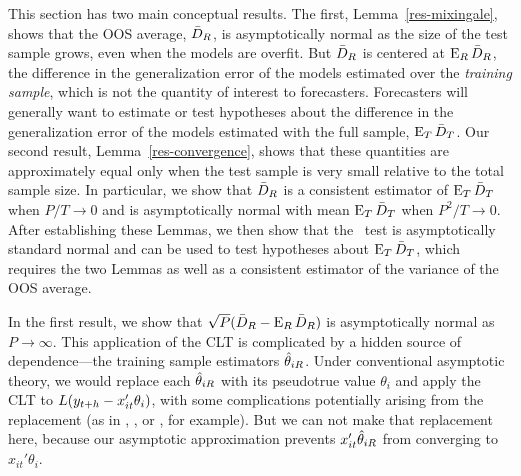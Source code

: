 \documentclass[12pt,draft]{article}
\begin{document}
This section has two main conceptual results. The first,
Lemma~\ref{res-mixingale}, shows that the OOS average, $\bar{D}_{R}$, is
asymptotically normal as the size of the test sample grows, even when
the models are overfit. But $\bar{D}_{R}$ is centered at $\operatorname{E}_R \bar{D}_{R}$, the
difference in the generalization error of the models estimated over
the \emph{training sample}, which is not the quantity of interest to
forecasters. Forecasters will generally want to estimate or test
hypotheses about the difference in the generalization error of the
models estimated with the full sample, $\operatorname{E}_T \bar{D}_{T}$. Our second
result, Lemma~\ref{res-convergence}, shows that these quantities are
approximately equal only when the test sample is very small relative
to the total sample size. In particular, we show that $\bar{D}_{R}$ is a
consistent estimator of $\operatorname{E}_T \bar{D}_{T}$ when $P/T \to 0$ and is
asymptotically normal with mean $\operatorname{E}_T \bar{D}_{T}$ when $P^2/T \to 0$. After
establishing these Lemmas, we then show that the \oost\ test is
asymptotically standard normal and can be used to test hypotheses
about $\operatorname{E}_T \bar{D}_{T}$, which requires the two Lemmas as well as a
consistent estimator of the variance of the OOS average.

In the first result, we show that
$\sqrt{P} (\bar{D}_{R} - \operatorname{E}_R \bar{D}_{R})$ is asymptotically normal as $P \to
\infty$. This application of the CLT is complicated by a hidden source
of dependence---the training sample estimators $\hat\theta_{iR}$. Under
conventional asymptotic theory, we would replace each $\hat\theta_{iR}$ with
its pseudotrue value $\theta_i$ and apply the CLT to
$L(y_{t+h} - x_{it}'\theta_i)$, with some complications potentially
arising from the replacement (as in \citealp{Wes:96},
\citealp{ClM:01}, or \citealp{Mcc:07}, for example). But we can not
make that replacement here, because our asymptotic approximation
prevents $x_{it}'\hat\theta_{iR}$ from converging to $x_{it}'\theta_i$.
\end{document}
